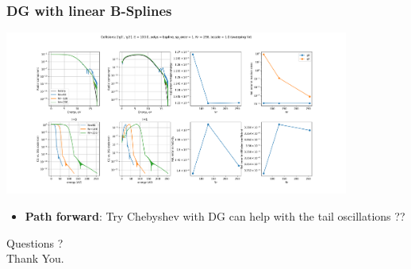 \documentclass[mathserif, aspectratio=169]{beamer}
\begin{document}
\begin{frame}
	\frametitle{DG with linear B-Splines}
	\begin{center}
		\includegraphics[width=0.85\textwidth]{fig/bspline_dg_vs_bolsig_g0_g2_E100.0_poly_bspline_sp_1_nr256_bscale1.0_sweeping_Nr.png}
	\end{center}
	\pause
	\begin{itemize}
		\item \textbf{Path forward}: Try Chebyshev with DG can help with the tail oscillations ??
	\end{itemize}
\end{frame}

\begin{frame}
	\begin{center}
		\onslide<+->\Large Questions ? \\
		\onslide<+>\Large Thank You. 
	\end{center}
\end{frame}
\end{document}
